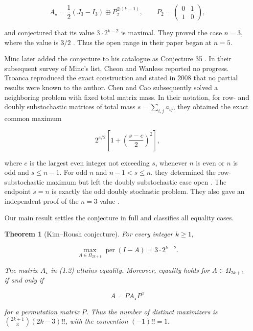 \documentclass[11pt]{article}
\newtheorem{theorem}{Theorem}[section]
\theoremstyle{remark}
\begin{document}
\[
A_\star=\frac12(J_3-I_3)\oplus P_2^{\oplus(k-1)},
\qquad
P_2=\begin{pmatrix}0&1\\1&0\end{pmatrix},
\tag{1.2}
\]

and conjectured that its value $3\cdot2^{k-2}$ is maximal. They proved the
case $n=3$, where the value is $3/2$ \cite[Proposition~5]{kimroush1981}. Thus the open range
in their paper began at $n=5$.

Minc later added the conjecture to his catalogue as Conjecture 35
\cite[p.~133]{minc1987}. In their subsequent survey of Minc's list, Cheon
and Wanless \cite{cheonwanless2005} reported no progress. Troanca
\cite{troanca2008} reproduced the exact construction and stated in 2008 that
no partial results were known to the author. Chen and Cao \cite{chencao2018}
subsequently solved a neighboring problem with
fixed total matrix mass. In their notation, for row- and doubly
substochastic matrices of total mass $s=\sum_{i,j}a_{ij}$, they obtained the
exact common maximum

\[
2^{e/2}\left[1+\left(\frac{s-e}{2}\right)^2\right],
\tag{1.3}
\]

where $e$ is the largest even integer not exceeding $s$, whenever $n$ is
even or $n$ is odd and $s\le n-1$. For odd $n$ and $n-1<s\le n$, they
determined the row-substochastic maximum but left the doubly substochastic
case open \cite[Theorems~3.1, 3.13, and~4.1]{chencao2018}. The endpoint $s=n$ is exactly
the odd doubly stochastic problem. They also gave an independent proof of
the $n=3$ value \cite[Lemma~4.2]{chencao2018}.

Our main result settles the conjecture in full and classifies all equality
cases.

\begin{theorem}[Kim--Roush conjecture]
For every integer $k\ge1$,

\[
\boxed{\max_{A\in\Omega_{2k+1}}\operatorname{per}(I-A)
=3\cdot2^{k-2}.}
\tag{1.4}
\]

The matrix $A_\star$ in (1.2) attains equality. Moreover, equality holds for
$A\in\Omega_{2k+1}$ if and only if

\[
A=PA_\star P^{\mathsf T}
\tag{1.5}
\]

for a permutation matrix $P$. Thus the number of distinct maximizers is
$\binom{2k+1}{3}(2k-3)!!$, with the convention $(-1)!!=1$.

\end{theorem}
\end{document}
